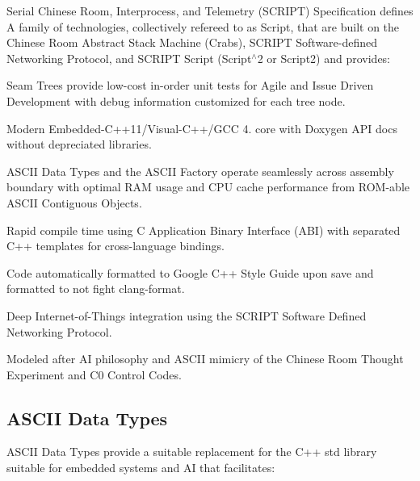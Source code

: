 Serial Chinese Room, Interprocess, and Telemetry (S\+C\+R\+I\+PT) Specification defines A family of technologies, collectively refereed to as Script, that are built on the Chinese Room Abstract Stack Machine (Crabs), S\+C\+R\+I\+PT Software-\/defined Networking Protocol, and S\+C\+R\+I\+PT Script (Script$^\wedge$2 or Script2) and provides\+:


\begin{DoxyItemize}
\item Seam Trees provide low-\/cost in-\/order unit tests for Agile and Issue Driven Development with debug information customized for each tree node.
\item Modern Embedded-\/\+C++11/\+Visual-\/\+C++/\+G\+CC 4. core with Doxygen A\+PI docs without depreciated libraries.
\item A\+S\+C\+II Data Types and the A\+S\+C\+II Factory operate seamlessly across assembly boundary with optimal R\+AM usage and C\+PU cache performance from R\+O\+M-\/able A\+S\+C\+II Contiguous Objects.
\item Rapid compile time using C Application Binary Interface (A\+BI) with separated C++ templates for cross-\/language bindings.
\item Code automatically formatted to Google C++ Style Guide upon save and formatted to not fight clang-\/format.
\item Deep Internet-\/of-\/\+Things integration using the S\+C\+R\+I\+PT Software Defined Networking Protocol.
\item Modeled after AI philosophy and A\+S\+C\+II mimicry of the Chinese Room Thought Experiment and C0 Control Codes.
\end{DoxyItemize}

\subsection*{A\+S\+C\+II Data Types}

A\+S\+C\+II Data Types provide a suitable replacement for the C++ std library suitable for embedded systems and AI that facilitates\+:


